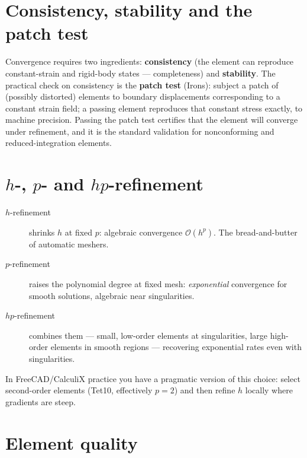 \section{Consistency, stability and the patch test}

Convergence requires two ingredients: \textbf{consistency} (the element
can reproduce constant-strain and rigid-body states --- completeness) and
\textbf{stability}. The practical check on consistency is the
\textbf{patch test} (Irons): subject a patch of (possibly distorted)
elements to boundary displacements corresponding to a constant strain
field; a passing element reproduces that constant stress exactly, to
machine precision. Passing the patch test certifies that the element will
converge under refinement, and it is the standard validation for
nonconforming and reduced-integration elements.

\section{$h$-, $p$- and $hp$-refinement}

\begin{description}
  \item[$h$-refinement] shrinks $h$ at fixed $p$: algebraic convergence
        $\mathcal O(h^p)$. The bread-and-butter of automatic meshers.
  \item[$p$-refinement] raises the polynomial degree at fixed mesh:
        \emph{exponential} convergence for smooth solutions, algebraic
        near singularities.
  \item[$hp$-refinement] combines them --- small, low-order elements at
        singularities, large high-order elements in smooth regions ---
        recovering exponential rates even with singularities.
\end{description}
In FreeCAD/CalculiX practice you have a pragmatic version of this choice:
select second-order elements (Tet10, effectively $p=2$) and then refine
$h$ locally where gradients are steep.

\section{Element quality}

